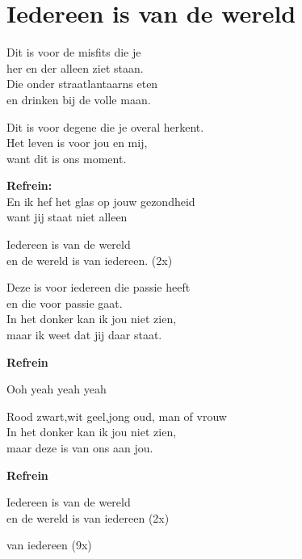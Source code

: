 \section{Iedereen is van de wereld}

Dit is voor de misfits die je \\
her en der alleen ziet staan.\\
Die onder straatlantaarns eten \\
en drinken bij de volle maan. 

Dit is voor degene die je overal herkent. \\
Het leven is voor jou en mij, \\
want dit is ons moment.

\textbf{Refrein:}\\
En ik hef het glas op jouw gezondheid\\
want jij staat niet alleen 

Iedereen is van de wereld \\
en de wereld is van iedereen. (2x)

Deze is voor iedereen die passie heeft \\
en die voor passie gaat. \\
In het donker kan ik jou niet zien,\\
maar ik weet dat jij daar staat. 

\textbf{Refrein}

Ooh yeah yeah yeah 

Rood zwart,wit geel,jong oud, man of vrouw \\
In het donker kan ik jou niet zien, \\
maar deze is van ons aan jou.

\textbf{Refrein}

Iedereen is van de wereld \\
en de wereld is van iedereen (2x)

van iedereen (9x)
